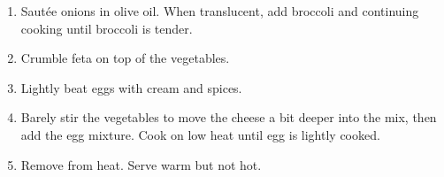 
\begin{ingredients}
\end{ingredients}


\begin{recipe}
  \begin{enumerate}

  \item Saut\'ee onions in olive oil.  When translucent, add broccoli and
    continuing cooking until broccoli is tender.

  \item Crumble feta on top of the vegetables.

  \item Lightly beat eggs with cream and spices.

  \item Barely stir the vegetables to move the cheese a bit deeper
    into the mix, then add the egg mixture.  Cook on low heat until
    egg is lightly cooked.

  \item Remove from heat.  Serve warm but not hot.

  \end{enumerate}
\end{recipe}
